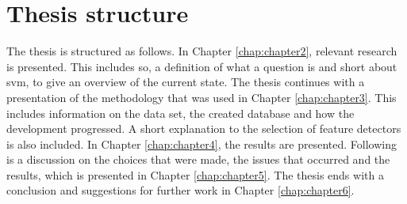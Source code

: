 \section{Thesis structure}
\label{sec:thesis_structure}
The thesis is structured as follows. In Chapter \ref{chap:chapter2}, relevant research is presented. 
This includes \gls{so}, a definition of what a question is and short about \gls{svm}, to give an overview of the current state. 
The thesis continues with a presentation of the methodology that was used in Chapter \ref{chap:chapter3}. 
This includes information on the data set, the created database and how the development progressed. 
A short explanation to the selection of feature detectors is also included. 
In Chapter \ref{chap:chapter4}, the results are presented.
Following is a discussion on the choices that were made, the issues that occurred and the results, which is presented in Chapter \ref{chap:chapter5}.
The thesis ends with a conclusion and suggestions for further work in Chapter \ref{chap:chapter6}.
